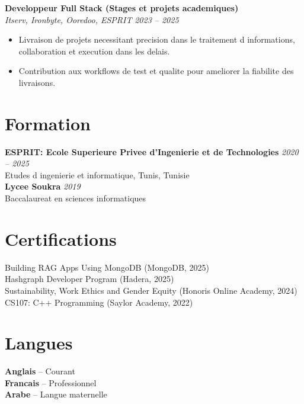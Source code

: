 \documentclass[10pt,a4paper]{article}
\begin{document}
{\vspace{3pt}
\textbf{Developpeur Full Stack (Stages et projets academiques)}\\[1pt]
\textit{Itserv, Ironbyte, Ooredoo, ESPRIT} \hfill \textit{2023 -- 2025}
\begin{itemize}
  \item Livraison de projets necessitant precision dans le traitement d informations, collaboration et execution dans les delais.
  \item Contribution aux workflows de test et qualite pour ameliorer la fiabilite des livraisons.
\end{itemize}

}

\vspace{4pt}
\section*{Formation}
{\small
\textbf{ESPRIT: Ecole Superieure Privee d'Ingenierie et de Technologies} \hfill \textit{2020 -- 2025}\\[1pt]
Etudes d ingenierie et informatique, Tunis, Tunisie\\[2pt]
\textbf{Lycee Soukra} \hfill \textit{2019}\\[1pt]
Baccalaureat en sciences informatiques
}

\vspace{4pt}
\section*{Certifications}
{\small
Building RAG Apps Using MongoDB (MongoDB, 2025)\\[1pt]
Hashgraph Developer Program (Hadera, 2025)\\[1pt]
Sustainability, Work Ethics and Gender Equity (Honoris Online Academy, 2024)\\[1pt]
CS107: C++ Programming (Saylor Academy, 2022)
}

\section*{Langues}
{\small
\textbf{Anglais} -- Courant\\[1pt]
\textbf{Francais} -- Professionnel\\[1pt]
\textbf{Arabe} -- Langue maternelle
}
\end{document}
